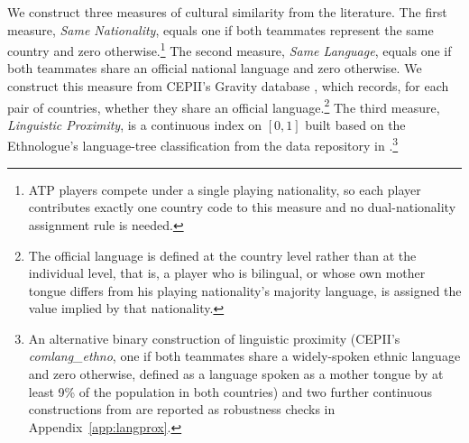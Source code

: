 \documentclass[10pt]{article}
\begin{document}
We construct three measures of cultural similarity from the literature. The first measure, \textit{Same Nationality}, equals one if both teammates represent the same country  and zero otherwise.\footnote{ATP players compete under a single playing nationality, so each player contributes exactly one country code to this measure and no dual-nationality assignment rule is needed.} The second measure, \textit{Same Language}, equals one if both teammates share an official national language and zero otherwise. We construct this measure from CEPII's Gravity database \citep{contecotterlazmayer2022}%
, which records, for each pair of countries, whether they share an official language.\footnote{The official language is defined at the country level rather than at the individual level, that is, a player who is bilingual, or whose own mother tongue differs from his playing nationality's majority language, is assigned the value implied by that nationality.}%
 The third measure, \textit{Linguistic Proximity}, is a continuous index on $[0,1]$ built based on the Ethnologue's language-tree classification from the data repository in \cite{melitztoubal2014}.\footnote{An alternative binary construction of linguistic proximity (CEPII's \textit{comlang\_ethno}, one if both teammates share a widely-spoken ethnic language and zero otherwise, defined as a language spoken as a mother tongue by at least 9\% of the population in both countries) and two further continuous constructions from \citet{psw2024} are reported as robustness checks in Appendix~\ref{app:langprox}.} %
\end{document}
